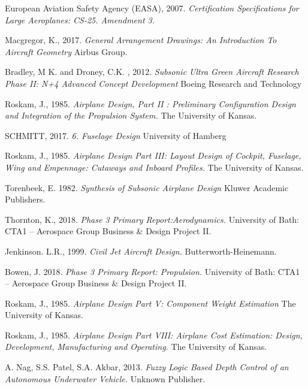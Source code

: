 \documentclass[11pt]{article}
\begin{document}
\begin{thebibliography}{9}
European Aviation Safety Agency (EASA), 2007.
\textit{Certification Specifications for Large Aeroplanes: CS-25. Amendment 3.}

Macgregor, K., 2017.
\textit{General Arrangement Drawings: An Introduction To Aircraft Geometry}
Airbus Group.

Bradley, M K. and Droney, C.K.  , 2012.
\textit{Subsonic Ultra Green Aircraft Research Phase II: N+4 Advanced Concept Development}
Boeing Research and Technology
 

Roskam, J., 1985. 
\textit{Airplane Design, Part II : Preliminary Configuration Design and Integration of the Propulsion System.}
The University of Kansas.

SCHMITT, 2017.
\textit{6. Fuselage Design}
University of Hamberg

Roskam, J., 1985.
\textit{Airplane Design Part III: Layout Design of Cockpit, Fuselage, Wing and Empennage: Cutaways and Inboard Profiles.}
The University of Kansas.

 Torenbeek, E. 1982.
\textit{Synthesis of Subsonic Airplane Design}
Kluwer Academic Publishers. 

Thornton, K., 2018.
\textit{Phase 3 Primary Report:Aerodynamics.}
University of Bath: CTA1 – Aerospace Group Business \& Design Project II.

Jenkinson. L.R., 1999.
\textit{Civil Jet Aircraft Design.}
Butterworth-Heinemann.

Bowen, J. 2018.
\textit{Phase 3 Primary Report: Propulsion.}
University of Bath: CTA1 – Aerospace Group Business \& Design Project II.

Roskam, J., 1985.
\textit{Airplane Design Part V: Component Weight Estimation}
The University of Kansas.

Roskam, J., 1985.
\textit{Airplane Design Part VIII: Airplane Cost Estimation: Design, Development, Manufacturing and Operating.}
The University of Kansas.

A. Nag, S.S. Patel, S.A. Akbar, 2013.
\textit{Fuzzy Logic Based Depth Control of an Autonomous Underwater Vehicle.}
Unknown Publisher. 


\end{thebibliography}
\end{document}
